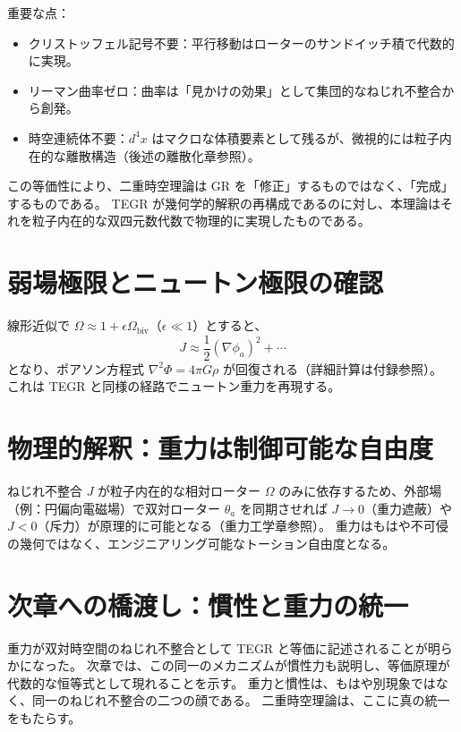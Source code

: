 \documentclass[dvipdfmx,a4paper]{jsbook}
\theoremstyle{definition}
\theoremstyle{remark}
\begin{document}
重要な点：
\begin{itemize}
  \item クリストッフェル記号不要：平行移動はローターのサンドイッチ積で代数的に実現。
  \item リーマン曲率ゼロ：曲率は「見かけの効果」として集団的なねじれ不整合から創発。
  \item 時空連続体不要：$d^4x$ はマクロな体積要素として残るが、微視的には粒子内在的な離散構造（後述の離散化章参照）。
\end{itemize}

この等価性により、二重時空理論は GR を「修正」するものではなく、「完成」するものである。  
TEGR が幾何学的解釈の再構成であるのに対し、本理論はそれを粒子内在的な双四元数代数で物理的に実現したものである。

\section{弱場極限とニュートン極限の確認}
\label{sec:weak-field}

線形近似で $\Omega \approx 1 + \epsilon \Omega_\text{biv}$（$\epsilon \ll 1$）とすると、
\begin{equation}
  J \approx \frac{1}{2} (\nabla \phi_a)^2 + \cdots
\end{equation}
となり、ポアソン方程式 $\nabla^2 \Phi = 4\pi G \rho$ が回復される（詳細計算は付録参照）。  
これは TEGR と同様の経路でニュートン重力を再現する。

\section{物理的解釈：重力は制御可能な自由度}
\label{sec:gravity-control-implication}

ねじれ不整合 $J$ が粒子内在的な相対ローター $\Omega$ のみに依存するため、外部場（例：円偏向電磁場）で双対ローター $\theta_a$ を同期させれば $J \to 0$（重力遮蔽）や $J < 0$（斥力）が原理的に可能となる（重力工学章参照）。  
重力はもはや不可侵の幾何ではなく、エンジニアリング可能なトーション自由度となる。

\section{次章への橋渡し：慣性と重力の統一}
\label{sec:to-inertia-unification}

重力が双対時空間のねじれ不整合として TEGR と等価に記述されることが明らかになった。  
次章では、この同一のメカニズムが慣性力も説明し、等価原理が代数的な恒等式として現れることを示す。  
重力と慣性は、もはや別現象ではなく、同一のねじれ不整合の二つの顔である。  
二重時空理論は、ここに真の統一をもたらす。
\end{document}

